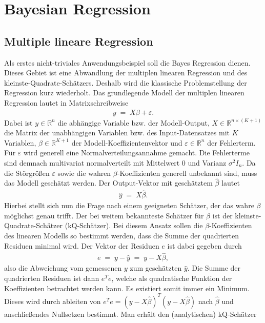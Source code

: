 \newpage
\thispagestyle{plain}
\section{Bayesian Regression}

\subsection{Multiple lineare Regression}

Als erstes nicht-triviales Anwendungsbeispiel soll die Bayes Regression dienen. Dieses Gebiet ist eine Abwandlung der multiplen linearen Regression und des kleinste-Quadrate-Schätzers. Deshalb wird die klassische Problemstellung der Regression kurz wiederholt. Das grundlegende Modell der multiplen linearen Regression lautet in Matrixschreibweise
\begin{align*}
	y\;=\;X\beta+\varepsilon.
\end{align*}
Dabei ist \(y\in\mathbb{R}^n\) die abhängige Variable bzw. der Modell-Output, \(X\in\mathbb{R}^{n\times (K+1)}\) die Matrix der unabhängigen Variablen bzw. des Input-Datensatzes mit \(K\) Variablen, \(\beta\in\mathbb{R}^{K+1}\) der Modell-Koeffizientenvektor und \(\varepsilon\in\mathbb{R}^{n}\) der Fehlerterm. Für \(\varepsilon\) wird generell eine Normalverteilungsannahme gemacht. Die Fehlerterme sind demnach multivariat normalverteilt mit Mittelwert 0 und Varianz \(\sigma^2I_n\). Da die Störgrößen \(\varepsilon\) sowie die wahren \(\beta\)-Koeffizienten generell unbekannt sind, muss das Modell geschätzt werden. Der Output-Vektor mit geschätztem \(\hat{\beta}\) lautet
\begin{align*}
	\hat{y}\;=\;X\hat{\beta}.
\end{align*}
Hierbei stellt sich nun die Frage nach einem geeigneten Schätzer, der das wahre \(\beta\) möglichst genau trifft. Der bei weitem bekannteste Schätzer für \(\beta\) ist der kleinste-Quadrate-Schätzer (kQ-Schätzer). Bei diesem Ansatz sollen die \(\beta\)-Koeffizienten des linearen Modells so bestimmt werden, dass die Summe der quadrierten Residuen minimal wird. Der Vektor der Residuen \(e\) ist dabei gegeben durch
\begin{align*}
	e\;=\;y-\hat{y}\;=\;y-X\hat{\beta},
\end{align*}
also die Abweichung vom gemessenen \(y\) zum geschätzten \(\hat{y}\). Die Summe der quadrierten Residuen ist dann \(e^Te\), welche als quadratische Funktion der Koeffizienten betrachtet werden kann. Es existiert somit immer ein Minimum. Dieses wird durch ableiten von \(e^Te=\left(y-X\hat{\beta}\right)^T\left(y-X\hat{\beta}\right)\) nach \(\hat{\beta}\) und anschließendes Nullsetzen bestimmt. Man erhält den (analytischen) kQ-Schätzer
